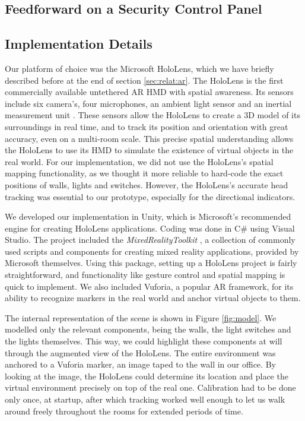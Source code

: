 \subsection{Feedforward on a Security Control Panel}
\todo{}

\subsection{Implementation Details}
Our platform of choice was the Microsoft HoloLens, which we have briefly described before at the end of section \ref{sec:relat:ar}. The HoloLens is the first commercially available untethered AR HMD with spatial awareness. Its sensors include six camera's, four microphones, an ambient light sensor and an inertial measurement unit \cite{HoloLens84:online}. These sensors allow the HoloLens to create a 3D model of its surroundings in real time, and to track its position and orientation with great accuracy, even on a multi-room scale. This precise spatial understanding allows the HoloLens to use its HMD to simulate the existence of virtual objects in the real world. For our implementation, we did not use the HoloLens's spatial mapping functionality, as we thought it more reliable to hard-code the exact positions of walls, lights and switches. However, the HoloLens's accurate head tracking was essential to our prototype, especially for the directional indicators.

We developed our implementation in Unity, which is Microsoft's recommended engine for creating HoloLens applications. Coding was done in C\# using Visual Studio. The project included the \textit{MixedRealityToolkit} \cite{Microsof99:online}, a collection of commonly used scripts and components for creating mixed reality applications, provided by Microsoft themselves. Using this package, setting up a HoloLens project is fairly straightforward, and functionality like gesture control and spatial mapping is quick to implement. We also included Vuforia, a popular AR framework, for its ability to recognize markers in the real world and anchor virtual objects to them.

The internal representation of the scene is shown in Figure \ref{fig:model}. We modelled only the relevant components, being the walls, the light switches and the lights themselves. This way, we could highlight these components at will through the augmented view of the HoloLens. The entire environment was anchored to a Vuforia marker, an image taped to the wall in our office. By looking at the image, the HoloLens could determine its location and place the virtual environment precisely on top of the real one. Calibration had to be done only once, at startup, after which tracking worked well enough to let us walk around freely throughout the rooms for extended periods of time.

